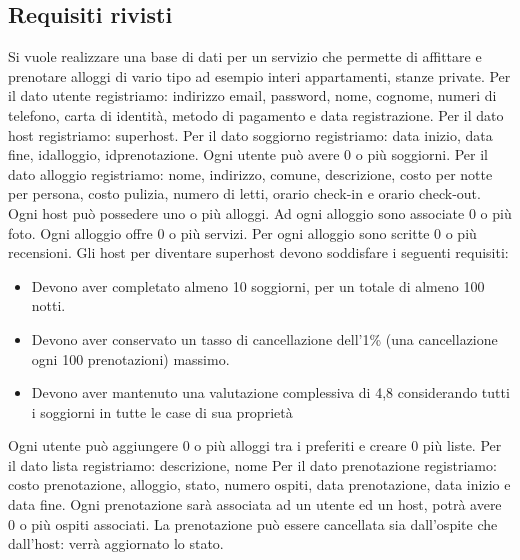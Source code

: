 \subsection{Requisiti rivisti}
Si vuole realizzare una base di dati per un servizio che permette di affittare e prenotare
alloggi di vario tipo ad esempio interi appartamenti, stanze private.
\newline
\newline
Per il dato utente registriamo: indirizzo email, password, nome, cognome, numeri di telefono, carta di identità, metodo di pagamento e data registrazione.
\newline
\newline
Per il dato host registriamo: superhost.
\newline
\newline
Per il dato soggiorno registriamo: data inizio, data fine, idalloggio, idprenotazione.
Ogni utente può avere 0 o più soggiorni.
\newline
\newline
Per il dato alloggio registriamo: nome, indirizzo, comune, descrizione, costo per notte per persona, costo pulizia, numero di letti, orario check-in e orario check-out.
Ogni host può possedere uno o più alloggi. Ad ogni alloggio sono associate 0 o più foto. Ogni alloggio offre 0 o più servizi. Per ogni alloggio sono scritte 0 o più recensioni.
\newline
\newline
Gli host per diventare superhost devono soddisfare i  seguenti requisiti:
\begin{itemize}
    \item Devono aver completato almeno 10 soggiorni, per un totale di almeno 100 notti.
    \item Devono aver conservato un tasso di cancellazione dell'1\% 
    (una cancellazione ogni 100 prenotazioni) massimo.
    \item Devono aver mantenuto una valutazione complessiva di 4,8 considerando 
    tutti i soggiorni in tutte le case di sua proprietà
\end{itemize}
Ogni utente può aggiungere 0 o più alloggi tra i preferiti e creare 0 più liste.
Per il dato lista registriamo: descrizione, nome
\newline
\newline
Per il dato prenotazione registriamo: costo prenotazione, alloggio, stato, numero ospiti, data prenotazione, data inizio e data fine. Ogni prenotazione sarà associata ad un utente ed un host, potrà avere 0 o più ospiti associati. La prenotazione può essere cancellata sia dall'ospite che dall'host: verrà aggiornato lo stato.
